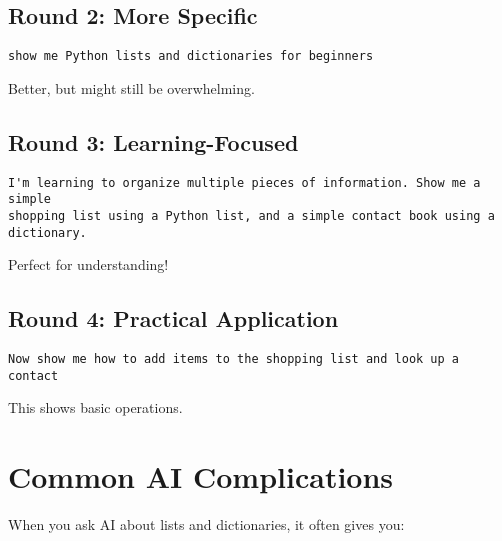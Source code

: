 \documentclass[
  letterpaper,
  DIV=11,
  numbers=noendperiod,
  oneside]{scrreprt}
\begin{document}
\subsection{Round 2: More Specific}\label{round-2-more-specific-5}

\begin{verbatim}
show me Python lists and dictionaries for beginners
\end{verbatim}

Better, but might still be overwhelming.

\subsection{Round 3: Learning-Focused}\label{round-3-learning-focused-6}

\begin{verbatim}
I'm learning to organize multiple pieces of information. Show me a simple 
shopping list using a Python list, and a simple contact book using a dictionary.
\end{verbatim}

Perfect for understanding!

\subsection{Round 4: Practical
Application}\label{round-4-practical-application}

\begin{verbatim}
Now show me how to add items to the shopping list and look up a contact
\end{verbatim}

This shows basic operations.

\section{Common AI Complications}\label{common-ai-complications-6}

When you ask AI about lists and dictionaries, it often gives you:
\end{document}
